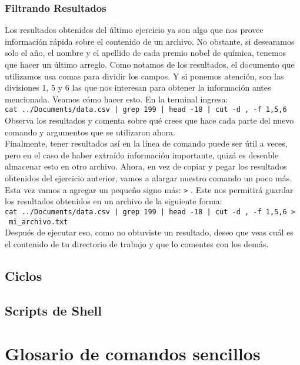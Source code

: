 \documentclass[10pt,letterpaper]{article}
\newcommand{\inlinecode}[1]{
\colorbox{light-gray}{\texttt{#1}}
}
\begin{document}
\subsubsection{Filtrando Resultados}
Los resultados obtenidos del \'ultimo ejercicio ya son algo que nos provee informaci\'on r\'apida sobre el contenido de un archivo. No obstante, si desearamos solo el a\~no, el nombre y el apellido de cada premio nobel de qu\'imica, tenemos que hacer un \'ultimo arreglo. Como notamos de los resultados, el documento que utilizamos usa comas para dividir los campos. Y si ponemos atenci\'on, son las divisiones 1, 5 y 6 las que nos interesan para obtener la informaci\'on antes mencionada. Veamos c\'omo hacer esto. En la terminal ingresa:\\
\inlinecode{cat ../Documents/data.csv | grep 199 | head -18 | cut -d , -f 1,5,6}\\
Observa los resultados y comenta sobre qu\'e crees que hace cada parte del nuevo comando y argumentos que se utilizaron ahora.\\

Finalmente, tener resultados as\'i en la l\'inea de comando puede ser \'util a veces, pero en el caso de haber extra\'ido informaci\'on importante, quiz\'a es deseable almacenar esto en otro archivo. Ahora, en vez de copiar y pegar los resultados obtenidos del ejercicio anterior, vamos a alargar nuestro comando un poco m\'as. Esta vez vamos a agregar un peque\~no signo m\'as: \inlinecode{>}. Este nos permitir\'a guardar los resultados obtenidos en un archivo de la siguiente forma:\\
\inlinecode{cat ../Documents/data.csv | grep 199 | head -18 | cut -d , -f 1,5,6 > \ mi\_archivo.txt}\\
Despu\'es de ejecutar eso, como no obtuviste un resultado, deseo que veas cu\'al es el contenido de tu directorio de trabajo y que lo comentes con los dem\'as.

\subsection{Ciclos}



\subsection{Scripts de Shell}


\section{Glosario de comandos sencillos}
\end{document}
